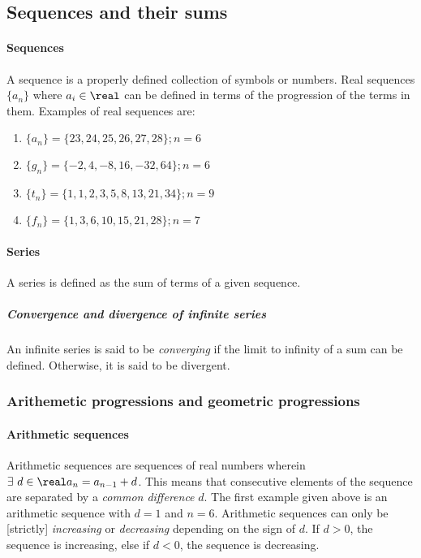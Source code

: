 \subsection{Sequences and their sums}

\paragraph{Sequences}
A sequence is a properly defined collection of symbols or numbers.
Real sequences $\{a_n\}$ where $a_i \in \real$ can be defined in terms of the progression of the terms in them.
Examples of real sequences are:
\begin{enumerate}
  \item $\{ a_n\} = \{ 23, 24, 25, 26, 27, 28\}; n = 6$
  \item $\{ g_n\} = \{ -2, 4, -8, 16, -32, 64\}; n = 6$
  \item $\{ t_n\} = \{ 1, 1, 2, 3, 5, 8, 13, 21, 34\}; n = 9$
  \item $\{ f_n\} = \{ 1, 3, 6, 10, 15, 21, 28\}; n = 7$
\end{enumerate}

\paragraph{Series}
A series is defined as the sum of terms of a given sequence.

\subparagraph{Convergence and divergence of infinite series}
An infinite series is said to be \emph{converging} if the limit to infinity of a sum can be defined.
Otherwise, it is said to be divergent.

\subsubsection{Arithemetic progressions and geometric progressions}

\paragraph{Arithmetic sequences} 
Arithmetic sequences are sequences of real numbers wherein $\exists\ d \in \real a_n = a_{n-1} + d$.
This means that consecutive elements of the sequence are separated by a \emph{common difference} $d$.
The first example given above is an arithmetic sequence with $d = 1$ and $n = 6$.
Arithmetic sequences can only be [strictly] \emph{increasing} or \emph{decreasing} depending on the sign of $d$.
If $d > 0$, the sequence is increasing, else if $d < 0$, the sequence is decreasing.

